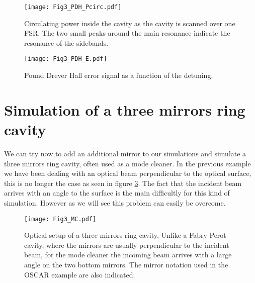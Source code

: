 \begin{figure}
\begin{center}
\texttt{[image: Fig3\_PDH\_Pcirc.pdf]}
\end{center}
\caption{Circulating power inside the cavity as the cavity is scanned over one FSR. The two small peaks around the main resonance indicate the resonance of the sidebands. \label{fig3:PDH_P}}
\end{figure}

\begin{figure}
\begin{center}
\texttt{[image: Fig3\_PDH\_E.pdf]}
\end{center}
\caption{Pound Drever Hall error signal as a function of the detuning.\label{fig3:PDH_E}}
\end{figure}

\clearpage

\section{Simulation of a three mirrors ring cavity}
\label{cha3.5}

We can try now to add an additional mirror to our simulations and simulate a three mirrors ring cavity, often used as a mode cleaner. In the previous example we have been dealing with an optical beam perpendicular to the optical surface, this is no longer the case as seen in figure \ref{fig3:MC1}. The fact that the incident beam arrives with an angle to the surface is the main difficultly for this kind of simulation. However as we will see this problem can easily be overcome.\\

\begin{figure}
\begin{center}
\texttt{[image: Fig3\_MC.pdf]}
\end{center}
\caption{Optical setup of a three mirrors ring cavity. Unlike a Fabry-Perot cavity, where the mirrors are usually perpendicular to the incident beam, for the mode cleaner the incoming beam arrives with a large angle on the two bottom mirrors. The mirror notation used in the OSCAR example are also indicated. \label{fig3:MC1}}
\end{figure}

